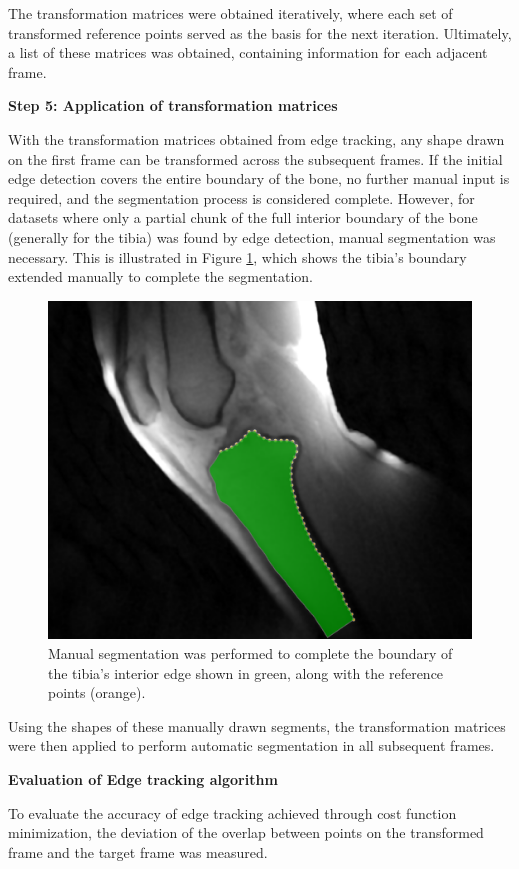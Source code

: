 \documentclass{micro-econ-thesis}
\begin{document}
The transformation matrices were obtained iteratively, where each set of transformed reference points served as the basis for the next iteration. Ultimately, a list of these matrices was obtained, containing information for each adjacent frame. 


\textbf{Step 5: Application of transformation matrices }

With the transformation matrices obtained from edge tracking, any shape drawn on the first frame can be transformed across the subsequent frames. If the initial edge detection covers the entire boundary of the bone, no further manual input is required, and the segmentation process is considered complete. However, for datasets where only a partial chunk of the full interior boundary of the bone (generally for the tibia) was found by edge detection, manual segmentation was necessary. This is illustrated in Figure \ref{fig:manualsegment}, which shows the tibia's boundary extended manually to complete the segmentation. 

\begin{figure} [H]
	\centering
	\includegraphics[width=0.7\linewidth]{manual_segment}
	\caption{Manual segmentation was performed to complete the boundary of the tibia's interior edge shown in green, along with the reference points (orange).}
	\label{fig:manualsegment}
\end{figure}

Using the shapes of these manually drawn segments, the transformation matrices were then applied to perform automatic segmentation in all subsequent frames. 

\textbf{Evaluation of Edge tracking algorithm}

To evaluate the accuracy of edge tracking achieved through cost function minimization, the deviation of the overlap between points on the transformed frame and the target frame was measured. 
\end{document}
